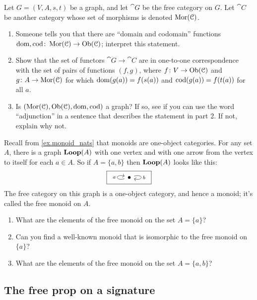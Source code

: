 \documentclass[7Sketches]{subfiles}
\begin{document}
\begin{exercise}%
\label{exc.free_cat_is_free}
Let $G=(V,A,s,t)$ be a graph, and let $\cat{G}$ be the free category on $G$. Let $\cat{C}$ be another category whose set of morphisms is denoted $\operatorname{Mor}(\mathcal{C})$. 
\begin{enumerate}
	\item Someone tells you that there are ``domain and codomain'' functions $\operatorname{dom},\operatorname{cod}\colon\operatorname{Mor}(\mathcal{C})\to\operatorname{Ob}(\mathcal{C})$; interpret this statement.
	\item Show that the set of functors $\cat{G} \to
\cat{C}$ are in one-to-one correspondence with the set of pairs of functions
$(f,g)$, where $f\colon V \to \operatorname{Ob}(\mathcal{C})$ and $g\colon A\to\operatorname{Mor}(\mathcal{C})$ for which $\operatorname{dom}(g(a))=f(s(a))$ and $\operatorname{cod}(g(a))=f(t(a))$ for all $a$.
	\item Is $(\operatorname{Mor}(\mathcal{C}),\operatorname{Ob}(\mathcal{C}),\operatorname{dom},\operatorname{cod})$ a graph? If so, see if you can use the word ``adjunction'' in a sentence that describes the statement in part 2. If not, explain why not.
\qedhere
\end{enumerate}
\end{exercise}

\begin{exercise}%
%
%
\label{exc.free_monoid}
Recall from \cref{ex.monoid_nats} that monoids are one-object categories. For any set $A$, there is a graph $\mathbf{Loop}(A)$ with one vertex and with one arrow from the vertex to itself for each $a\in A$. So if $A=\{a,b\}$ then $\mathbf{Loop}(A)$ looks like this:
\[
\fbox{
\begin{tikzcd}[ampersand replacement=\&]
	\bullet\ar[loop left, "a"]\ar[loop right, "b"]
\end{tikzcd}
}
\]
The free category on this graph is a one-object category, and hence a monoid; it's called the free monoid on $A$.
\begin{enumerate}
	\item What are the elements of the free monoid on the set $A=\{a\}$?
	\item Can you find a well-known monoid that is isomorphic to the free monoid on $\{a\}$?%
	\item What are the elements of the free monoid on the set $A=\{a,b\}$?
\qedhere
\end{enumerate}
\end{exercise}



\subsection{The free prop on a signature}
\end{document}
